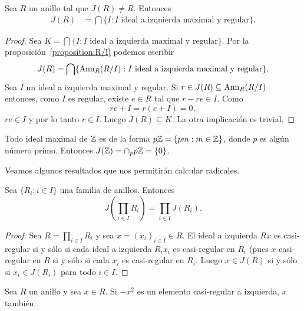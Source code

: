 \begin{theorem}
	\label{thm:J(R)}
	Sea $R$ un anillo tal que $J(R)\ne R$.  Entonces 
	\begin{align*}
		J(R)&=\bigcap\{I:\text{$I$ ideal a izquierda maximal y regular}\}.
	\end{align*}
\end{theorem}

\begin{proof}
	Sea $K=\bigcap\{I:\text{$I$ ideal a izquierda maximal y regular}\}$. Por la
	proposición~\ref{proposition:R/I} podemos escribir
	\[
		J(R)=\bigcap\{\operatorname{Ann}_R(R/I):I\text{ ideal a izquierda maximal y regular}\}.
	\]
	Sea $I$ un ideal a izquierda maximal y regular. Si $r\in J(R)\subseteq
	\operatorname{Ann}_R(R/I)$ entonces, como $I$ es regular, existe $e\in R$ tal que
	$r-re\in I$. Como
	\[
	re+I=r(e+I)=0,
	\]
	$re\in I$ y por lo tanto $r\in I$. Luego $J(R)\subseteq K$. 
	La otra implicación es trivial.
\end{proof}

\begin{example}
	Todo ideal maximal de $\mathbb{Z}$ es de la forma $p\mathbb{Z}=\{pm:m\in\mathbb{Z}\}$, donde $p$ es algún número
	primo. Entonces $J(\mathbb{Z})=\cap_p p\mathbb{Z}=\{0\}$.
\end{example}


Veamos algunos resultados que nos permitirán calcular radicales. 

\begin{proposition}
	Sea $\{R_i:i\in I\}$ una familia de anillos. Entonces 
	\[
	J\left(\prod_{i\in I}R_i\right)=\prod_{i\in I}J(R_i).
	\]
\end{proposition}

\begin{proof}
	Sea $R=\prod_{i\in I}R_i$ y sea $x=(x_i)_{i\in I}\in R$.  El ideal a
	izquierda $Rx$ es casi-regular si y sólo si cada ideal a izquierda $R_ix_i$
	es casi-regular en $R_i$ (pues  $x$ casi-regular en $R$ si y sólo si cada
	$x_i$ es casi-regular en $R_i$.  Luego $x\in J(R)$ si y sólo si $x_i\in
	J(R_i)$ para todo $i\in I$.
\end{proof}

\begin{lemma}
	\label{lemma:trickJ1}
	Sea $R$ un anillo y sea $x\in R$.  Si $-x^2$ es un elemento casi-regular a
	izquierda, $x$ también. 
\end{lemma}

